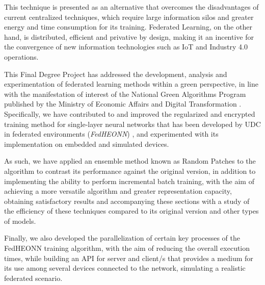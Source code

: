 \documentclass[00-Trabajo_Final.tex]{subfiles}
\begin{document}
This technique is presented as an alternative that overcomes the disadvantages of current centralized techniques, which require large information silos and greater energy and time consumption for its training. Federated Learning, on the other hand, is distributed, efficient and privative by design, making it an incentive for the convergence of new information technologies such as IoT and Industry 4.0 operations.

This Final Degree Project has addressed the development, analysis and experimentation of federated learning methods within a green perspective, in line with the manifestation of interest of the National Green Algorithms Program \cite{libro_PNAV} published by the Ministry of Economic Affairs and Digital Transformation \cite{web_ministerio}. Specifically, we have contributed to and improved the regularized and encrypted training method for single-layer neural networks that has been developed by UDC in federated environments (\textit{FedHEONN}) \cite{paper_FEDHEONN}, and experimented with its implementation on embedded and simulated devices.

As such, we have applied an ensemble method known as Random Patches to the algorithm to contrast its performance against the original version, in addition to implementing the ability to perform incremental batch training, with the aim of achieving a more versatile algorithm and greater representation capacity, obtaining satisfactory results and accompanying these sections with a study of the efficiency of these techniques compared to its original version and other types of models.

Finally, we also developed the parallelization of certain key processes of the FedHEONN training algorithm, with the aim of reducing the overall execution times, while building an API for server and client/s that provides a medium for its use among several devices connected to the network, simulating a realistic federated scenario.

\cleardoublepage
\end{document}

